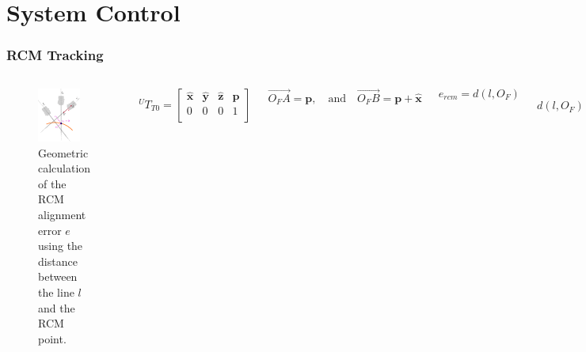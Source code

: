 \section{System Control}

\begin{frame}
\frametitle{RCM Tracking}

\begin{columns}
\begin{center}
\begin{figure}[!htb]
\centering
\includegraphics[width=0.8\textwidth]{../images/robot_planner6/rcm-error-geometry.png}
\caption{Geometric calculation of the RCM alignment error $e$ using the distance between the line $l$ and the RCM point.}
\label{rcm-error-geometry}
\end{figure}
\end{center}

\[
{}^UT_{T0} = \begin{bmatrix}
\mathbf{\hat{x}} & \mathbf{\hat{y}} & \mathbf{\hat{z}} & \mathbf{p} \\
0                & 0                & 0                & 1 \\
\end{bmatrix}
\]

\[
\overrightarrow{O_FA} = \mathbf{p}, \quad \textrm{and} \quad \overrightarrow{O_FB} = \mathbf{p} + \mathbf{\hat{x}}
\]

\[
e_{rcm} = d(l, O_F)
\]

\[
d(l, O_F) = \frac{\Vert \overrightarrow{O_FA} \times \mathbf{\hat{x}} \Vert}{\Vert \mathbf{\hat{x}} \Vert}
\]
\end{columns}
\end{frame}


